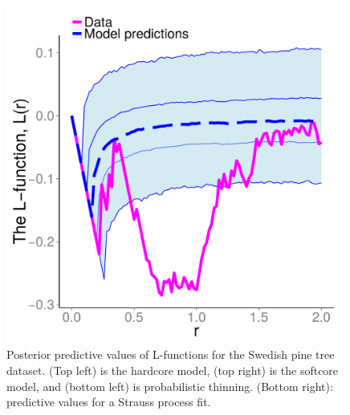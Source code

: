 \documentclass{statsoc}
\begin{document}
  \begin{figure}
  \begin{minipage}[h]{0.22\linewidth}
  \caption[Post Pred]{Posterior predictive values of L-functions for the Swedish pine tree dataset. (Top left) is the \matern hardcore model,
  (top right) is the softcore model, and (bottom left) is probabilistic thinning. (Bottom right): predictive values for a Strauss process fit.}
  \label{fig:swed_L_pred}
  \end{minipage}
  \begin{minipage}[h]{0.76\linewidth}
  \begin{minipage}[h]{0.49\linewidth}
  \centering
  \includegraphics[width=0.99\textwidth]{figs/Jfunc_postpred_R10/swed_hc_Lfunc.pdf}
  \end{minipage}
  \begin{minipage}[h]{0.49\linewidth}
  \centering

\end{minipage}
\end{minipage}
\end{figure}
\end{document}
